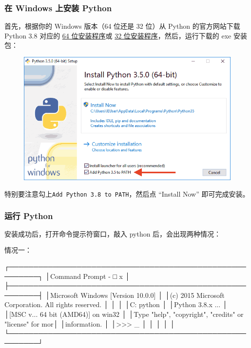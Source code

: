 \hypertarget{ux5728-windows-ux4e0aux5b89ux88c5-python}{%
\subsubsection{在 Windows 上安装
Python}\label{ux5728-windows-ux4e0aux5b89ux88c5-python}}

首先，根据你的 Windows 版本（64 位还是 32 位）从 Python 的官方网站下载
Python 3.8 对应的
\href{https://www.python.org/ftp/python/3.8.0/python-3.8.0-amd64.exe}{64
位安装程序}或
\href{https://www.python.org/ftp/python/3.8.0/python-3.8.0.exe}{32
位安装程序}，然后，运行下载的 exe 安装包：

 
 \begin{figure}[htp]
	\centering
	\includegraphics[width=0.6\linewidth]{fig/1048401552601344l.png}
\end{figure}


特别要注意勾上\texttt{Add\ Python\ 3.8\ to\ PATH}，然后点 ``Install
Now'' 即可完成安装。

\hypertarget{ux8fd0ux884c-python}{%
\subsubsection{运行 Python}\label{ux8fd0ux884c-python}}

安装成功后，打开命令提示符窗口，敲入 python 后，会出现两种情况：

情况一：

\begin{pythoncode}
┌────────────────────────────────────────────────────────┐
│Command Prompt                                    - □ x │
├────────────────────────────────────────────────────────┤
│Microsoft Windows [Version 10.0.0]                      │
│(c) 2015 Microsoft Corporation. All rights reserved.    │
│                                                        │
│C:\> python                                             │
│Python 3.8.x ...                                        │
│[MSC v... 64 bit (AMD64)] on win32                      │
│Type "help", "copyright", "credits" or "license" for mor│
│information.                                            │
│>>> _                                                   │
│                                                        │
│                                                        │
└────────────────────────────────────────────────────────┘
\end{pythoncode}

